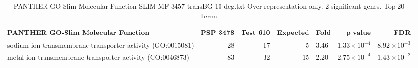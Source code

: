 \begin{table}[ht]
\centering
\begin{adjustbox}{width=\textwidth}
\begin{tabular}{lrrrlrr}
  \hline
PANTHER GO-Slim Molecular Function & PSP 3478 & Test 610 & Expected & Fold & p value & FDR \\ 
  \hline
sodium ion transmembrane transporter activity (GO:0015081) & 28 & 17 & 5 & 3.46 & $1.33 \times 10^{-4}$ & $8.92 \times 10^{-3}$ \\ 
  metal ion transmembrane transporter activity (GO:0046873) & 83 & 32 & 15 & 2.20 & $2.75 \times 10^{-4}$ & $1.43 \times 10^{-2}$ \\ 
   \hline
\end{tabular}
\end{adjustbox}
\caption{PANTHER GO-Slim Molecular Function SLIM MF 3457 transBG 10 deg.txt Over representation only. 2 significant genes. Top 20 Terms} 
\label{tab:PANTHER GO-Slim Molecular Function SLIM MF 3457 transBG 10 deg.txt Over representation only. 2 significant genes. Top 20 Terms}
\end{table}





